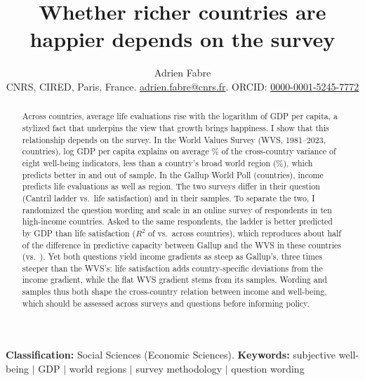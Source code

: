 \documentclass[10pt]{article}
\title{Whether richer countries are happier depends on the survey} %
\author{Adrien Fabre\\ \small CNRS, CIRED, %
Paris, France. \href{mailto:adrien.fabre@cnrs.fr}{adrien.fabre@cnrs.fr}. ORCID: \href{https://orcid.org/0000-0001-5245-7772}{0000-0001-5245-7772}}
\date{}
\begin{document}
\maketitle
\linenumbers

\noindent\textbf{Classification:} Social Sciences (Economic Sciences). \textbf{Keywords:} subjective well-being $|$ GDP $|$ world regions $|$ survey methodology $|$ question wording

\begin{abstract}
\noindent Across countries, average life evaluations rise with the logarithm of GDP per capita, a stylized fact that underpins the view that growth brings happiness. I show that this relationship depends on the survey. In the World Values Survey (WVS, 1981--2023, \nWVSCountries countries), log GDP per capita explains on average \meanRtwoIncomePPP\% of the cross-country variance of eight well-being indicators, less than a country's broad world region (\meanRtwoRegion\%), which predicts better in and out of sample. In the Gallup World Poll (\nGallupCountries countries), income predicts life evaluations as well as region. The two surveys differ in their question (Cantril ladder vs.\ life satisfaction) and in their samples. To separate the two, I randomized the question wording and scale in an online survey of \nFabre respondents in ten high-income countries. Asked to the same respondents, the ladder is better predicted by GDP than life satisfaction ($R^2$ of \RtwoTenFabreLadderPooled vs.\ \RtwoTenFabreSatisfactionPooled across countries), which reproduces about half of the difference in predictive capacity between Gallup and the WVS in these countries (\RtwoTenGallup vs.\ \RtwoTenWVS). Yet both questions yield income gradients as steep as Gallup's, three times steeper than the WVS's: life satisfaction adds country-specific deviations from the income gradient, while the flat WVS gradient stems from its samples. Wording and samples thus both shape the cross-country relation between income and well-being, which should be assessed across surveys and questions before informing policy.

\end{abstract}
\end{document}
